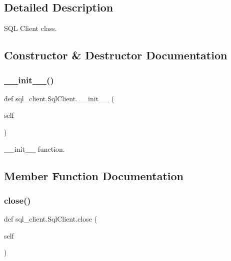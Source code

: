 \subsection{Detailed Description}
\begin{DoxyVerb}SQL Client class.
\end{DoxyVerb}
 

\subsection{Constructor \& Destructor Documentation}
\mbox{\label{classsql__client_1_1_sql_client_a6800fef274fbc6b3f5f27fe2e69aa4f0}} 
\subsubsection{\texorpdfstring{\+\_\+\+\_\+init\+\_\+\+\_\+()}{\_\_init\_\_()}}
{\footnotesize\ttfamily def sql\+\_\+client.\+Sql\+Client.\+\_\+\+\_\+init\+\_\+\+\_\+ (\begin{DoxyParamCaption}\item[{}]{self }\end{DoxyParamCaption})}

\begin{DoxyVerb}__init__ function.
\end{DoxyVerb}
 

\subsection{Member Function Documentation}
\mbox{\label{classsql__client_1_1_sql_client_ab74d313a5b3e9a155fd0ad64bd22a1df}} 
\subsubsection{\texorpdfstring{close()}{close()}}
{\footnotesize\ttfamily def sql\+\_\+client.\+Sql\+Client.\+close (\begin{DoxyParamCaption}\item[{}]{self }\end{DoxyParamCaption})}


